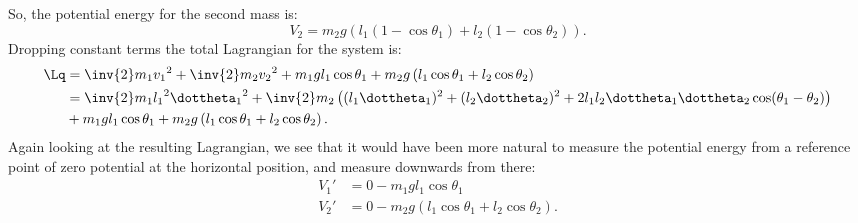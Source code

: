 {%
So, the potential energy for the second mass is:
\begin{equation}\label{eqn:tongMf1:1460}
V_2 = m_2 g \left( l_1 (1 - \cos\theta_1) + l_2 (1 - \cos\theta_2) \right).
\end{equation}
%
Dropping constant terms the total Lagrangian for the system is:
%
\begin{equation}\label{eqn:tongMf1:440}
\begin{aligned}
\Lq
&= \inv{2}m_1 {v_1}^2 +\inv{2}m_2 {v_2}^2 + m_1 g l_1 \cos\theta_1 + m_2 g \left( l_1 \cos\theta_1 + l_2 \cos\theta_2 \right) \\
&=
\inv{2} m_1 {l_1}^2 {\dottheta_1}^2
+ \inv{2} m_2 \left( (l_1 \dottheta_1)^2 + (l_2 \dottheta_2)^2 + 2 l_1 l_2 \dottheta_1 \dottheta_2 \cos(\theta_1 -\theta_2) \right) \\
&+ m_1 g l_1 \cos\theta_1 + m_2 g \left( l_1 \cos\theta_1 + l_2 \cos\theta_2 \right) .
\end{aligned}
\end{equation}
%
Again looking at the resulting Lagrangian, we see that it would have been more natural to measure the potential energy from a reference point of zero potential at the horizontal position, and measure downwards from there:
%
\begin{equation}\label{eqn:tongMf1:460}
\begin{aligned}
V_1' &= 0 - m_1 g l_1 \cos\theta_1 \\
V_2' &= 0 - m_2 g \left( l_1 \cos\theta_1 + l_2 \cos\theta_2 \right).
\end{aligned}
\end{equation}
}
%
